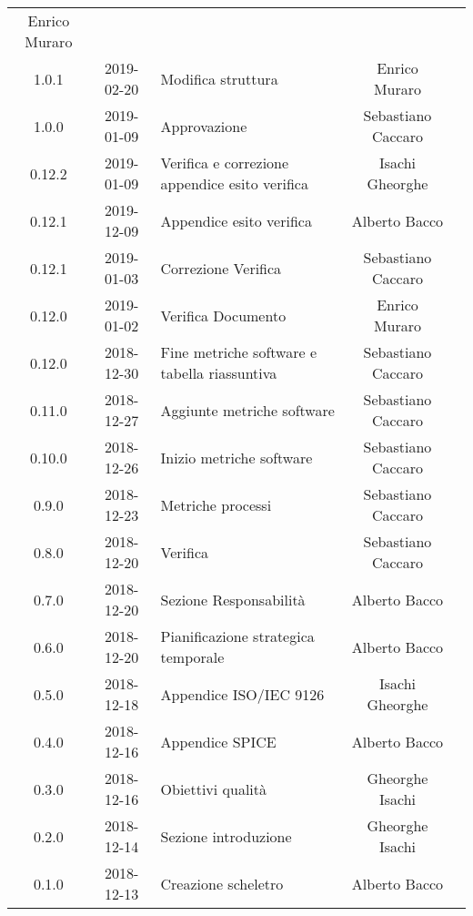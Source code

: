 {\begin{longtable}{c c C{4cm} c  c }
		Enrico Muraro &
		\reda{}
		\\
		1.0.1 &
		2019-02-20 &
		Modifica struttura &
		Enrico Muraro &
		\reda{}
		\\
		1.0.0 &
		2019-01-09 &
		Approvazione &
		Sebastiano Caccaro &
		\Res{}
		\\
		0.12.2 &
		2019-01-09 &
		Verifica e correzione appendice esito verifica &
		Isachi Gheorghe &
		\ver{}
		\\
		0.12.1 &
		2019-12-09 &
		Appendice esito verifica &
		Alberto Bacco &
		\ver{}
		\\
		0.12.1 &
		2019-01-03 &
		Correzione Verifica &
		Sebastiano Caccaro &
		\reda{}
		\\
		0.12.0 &
		2019-01-02 &
		Verifica Documento &
		Enrico Muraro &
		\ver{}
		\\
		0.12.0 &
		2018-12-30 &
		Fine metriche software e tabella riassuntiva &
		Sebastiano Caccaro &
		\reda{}
		\\
		0.11.0 &
		2018-12-27 &
		Aggiunte metriche software  &
		Sebastiano Caccaro &
		\reda{}
		\\
		0.10.0 &
		2018-12-26 &
		Inizio metriche software &
		Sebastiano Caccaro &
		\reda{}
		\\
		0.9.0 &
		2018-12-23 &
		Metriche processi &
		Sebastiano Caccaro &
		\reda{}
		\\
		0.8.0 &
		2018-12-20 &
		Verifica &
		Sebastiano Caccaro &
		\reda{}		
		\\
		0.7.0 &
		2018-12-20 &
		Sezione Responsabilità &
		Alberto Bacco &
		\reda{}
		\\
		0.6.0 &
		2018-12-20 &
		Pianificazione strategica temporale &
		Alberto Bacco &
		\reda{}
		\\
		0.5.0 &
		2018-12-18 &
		Appendice ISO/IEC 9126 &
		Isachi Gheorghe &
		\reda{}
		\\
		0.4.0 &
		2018-12-16 &
		Appendice SPICE &
		Alberto Bacco &
		\reda{}
		\\
		0.3.0 &
		2018-12-16 &
		Obiettivi qualità &
		Gheorghe Isachi &
		\reda{}
		\\
		0.2.0 &
		2018-12-14 &
		Sezione introduzione &
		Gheorghe Isachi&
		\reda{}
		\\
		0.1.0 &
		2018-12-13 &
		Creazione scheletro &
		Alberto Bacco&
		\reda{}
		\\
	\end{longtable}

}